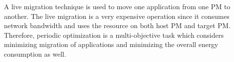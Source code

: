



\vspace{5mm}


 A live migration technique is used to move one application from one PM to another. The live migration is a very expensive operation since it consumes network bandwidth and uses the resource on both host PM and target PM. Therefore, periodic optimization is a multi-objective task which considers minimizing migration of applications and minimizing the overall energy consumption as well. 

